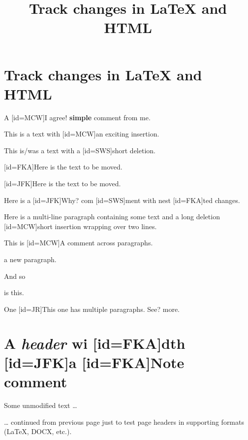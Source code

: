 \documentclass[
]{article}
\title{Track changes in LaTeX and HTML}
\date{}
\makeatletter
\newcommand{\note}[2][]{\added[#1,remark={#2}]{}}
\newcommand\hlnotesingle{%
  \bgroup
  \expandafter\def\csname sout\space\endcsname{\bgroup \ULdepth =-.8ex \ULset}%
  \markoverwith{\textcolor{yellow}{\rule[-.5ex]{.1pt}{2.5ex}}}%
  \ULon}
\newcommand\hlnote[1]{\let\helpcmd\hlnotesingle\parhelp#1\par\relax\relax}
\newcommand\ifmoving{%
  \ifx\protect\@unexpandable@protect
      \expandafter\@firstoftwo
  \else
      \expandafter\@secondoftwo
  \fi
}
\newcommand{\gobbletwo}[2][]{\@bsphack\@esphack}
\newcommand{\gobbleone}[1][]{\@bsphack\@esphack}
\let\oldadded\added
\let\olddeleted\deleted
\let\oldhlnote\hlnote
\let\oldnote\note
\renewcommand{\added}{\ifmoving{\gobbleone}{\oldadded}}
\renewcommand{\deleted}{\ifmoving{\gobbletwo}{\olddeleted}}
\renewcommand{\hlnote}{\ifmoving{}{\oldhlnote}}
\renewcommand{\note}{\ifmoving{\gobbletwo}{\oldnote}}
\makeatother
\begin{document}
\maketitle

{
\setcounter{tocdepth}{3}
\tableofcontents
}
\hypertarget{track-changes-in-latex-and-html}{%
\section{Track changes in LaTeX and HTML}\label{track-changes-in-latex-and-html}}

A \note[id=MCW]{I agree!}\hlnote{\textbf{simple}} comment from me.

This is a text with \added[id=MCW]{an exciting} insertion.

This is/was a text with a \deleted[id=SWS]{short} deletion.

\added[id=FKA]{Here is the text to be moved.}

\deleted[id=JFK]{Here is the text to be moved.}

Here is a \note[id=JFK]{Why?}\hlnote{com\added[id=SWS]{m}ent with nest\deleted[id=FKA]{t}ed changes}.

Here is a multi-line paragraph containing some text and a long deletion \deleted[id=MCW]{short insertion} wrapping over two lines.

This is \note[id=MCW]{A comment across paragraphs.}\hlnote{a new paragraph.

And so} is this.

One \note[id=JR]{This one has multiple paragraphs. \newline \newline See?}\hlnote{more}.

\hypertarget{a-header-width-a-notecomment}{%
\section{\texorpdfstring{A \emph{header} wi\deleted[id=FKA]{d}th \added[id=JFK]{a} \note[id=FKA]{Note}\hlnote{comment}}{A header with  comment}}\label{a-header-width-a-notecomment}}

Some unmodified text \ldots{}

\newpage

\ldots{} continued from previous page just to test page headers in supporting formats (LaTeX, DOCX, etc.).
\end{document}
